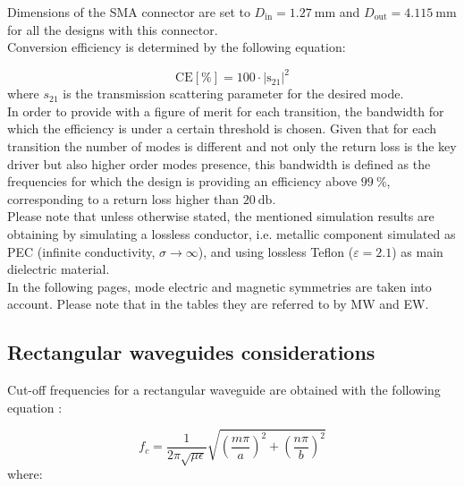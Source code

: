 \documentclass[english,twoside]{article}
\begin{document}
		Dimensions of the \ac{SMA} connector are set to $D_{\mathrm{in}}=\SI{1.27}{\milli\metre}$ and $D_{\mathrm{out}}=\SI{4.115}{\milli\meter}$ for all the designs with this connector.\\
			
		Conversion efficiency is determined by the following equation:
		
		\begin{equation} \label{eq:conversion_eff}
			\mathrm{CE [\%] = 100 \cdot |s_{21}|^2}
		\end{equation}
		where $s_{21}$ is the transmission scattering parameter for the desired mode.\\
    
    In order to provide with a figure of merit for each transition, the bandwidth for which the efficiency is under a certain threshold is chosen. Given that for each transition the number of modes is different and not only the return loss is the key driver but also higher order modes presence, this bandwidth is defined as the frequencies for which the design is providing an efficiency above $\SI{99}{\percent}$, corresponding to a return loss higher than $\SI{20}{\decibel}$.\\
    
    Please note that unless otherwise stated, the mentioned simulation results are obtaining by simulating a lossless conductor, i.e. metallic component simulated as \ac{PEC} (infinite conductivity, $\sigma \to \infty$), and using lossless Teflon ($\varepsilon=2.1$) as main dielectric material.\\
    
    In the following pages, mode electric and magnetic symmetries are taken into account. Please note that in the tables they are referred to by \ac{MW} and \ac{EW}.
    
    \subsection{Rectangular waveguides considerations}
      Cut-off frequencies for a rectangular waveguide are obtained with the following equation \cite{collin}:
	  
	  \begin{equation} \label{eq:wr_fc}
	  	f_c=\frac{1}{2\pi\sqrt{\mu\epsilon}}\sqrt{\left(\frac{m\pi}{a}\right)^2+\left(\frac{n\pi}{b}\right)^2}
	  \end{equation}	
      where:
      
\end{document}

